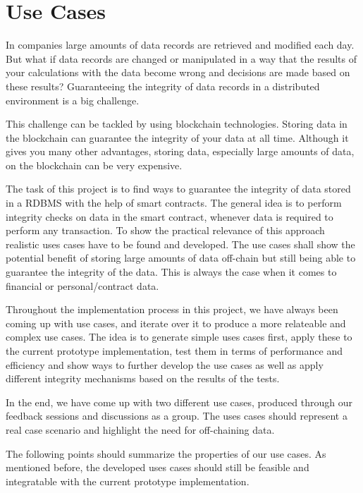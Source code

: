\chapter{Use Cases} \label{sssec:use_cases}

In companies large amounts of data records are retrieved and modified each day. But what if data records are changed or manipulated in a way that the results of your calculations with the data become wrong and decisions are made based on these results? Guaranteeing the integrity of data records in a distributed environment is a big challenge.

This challenge can be tackled by using blockchain technologies. Storing data in the blockchain can guarantee the integrity of your data at all time. Although it gives you many other advantages, storing data, especially large amounts of data, on the blockchain can be very expensive.

The task of this project is to find ways to guarantee the integrity of data stored in a RDBMS with the help of smart contracts. The general idea is to perform integrity checks on data in the smart contract, whenever data is required to perform any transaction. To show the practical relevance of this approach realistic uses cases have to be found and developed. The use cases shall show the potential benefit of storing large amounts of data off-chain but still being able to guarantee the integrity of the data. This is always the case when it comes to financial or personal/contract data.

Throughout the implementation process in this project, we have always been coming up with use cases, and iterate over it to produce a more relateable and complex use cases. The idea is to generate simple uses cases first, apply these to the current prototype implementation, test them in terms of performance and efficiency and show ways to further develop the use cases as well as apply different integrity mechanisms based on the results of the tests.

In the end, we have come up with two different use cases, produced through our feedback sessions and discussions as a group. The uses cases should represent a real case scenario and highlight the need for off-chaining data.

The following points should summarize the properties of our use cases. As mentioned before, the developed uses cases should still be feasible and integratable with the current prototype implementation. 

